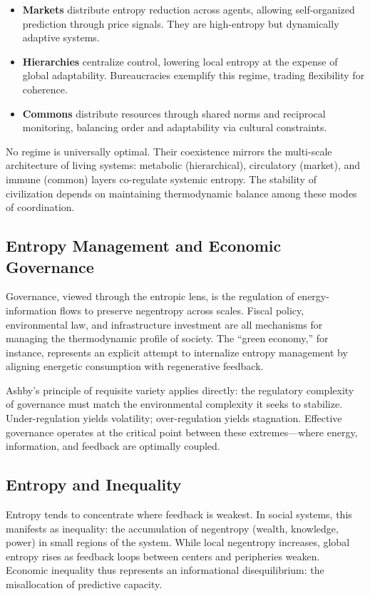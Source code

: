 \documentclass[11pt,a4paper]{article}
\begin{document}
\begin{itemize}
    \item \textbf{Markets} distribute entropy reduction across agents, allowing self-organized prediction through price signals.  They are high-entropy but dynamically adaptive systems.
    \item \textbf{Hierarchies} centralize control, lowering local entropy at the expense of global adaptability.  Bureaucracies exemplify this regime, trading flexibility for coherence.
    \item \textbf{Commons} distribute resources through shared norms and reciprocal monitoring, balancing order and adaptability via cultural constraints.
\end{itemize}

No regime is universally optimal.  Their coexistence mirrors the multi-scale architecture of living systems: metabolic (hierarchical), circulatory (market), and immune (common) layers co-regulate systemic entropy.  The stability of civilization depends on maintaining thermodynamic balance among these modes of coordination.

\subsection{Entropy Management and Economic Governance}

Governance, viewed through the entropic lens, is the regulation of energy-information flows to preserve negentropy across scales.  Fiscal policy, environmental law, and infrastructure investment are all mechanisms for managing the thermodynamic profile of society.  The “green economy,” for instance, represents an explicit attempt to internalize entropy management by aligning energetic consumption with regenerative feedback.

Ashby’s principle of requisite variety \citep{Ashby1956DesignBrain} applies directly: the regulatory complexity of governance must match the environmental complexity it seeks to stabilize.  Under-regulation yields volatility; over-regulation yields stagnation.  Effective governance operates at the critical point between these extremes—where energy, information, and feedback are optimally coupled.

\subsection{Entropy and Inequality}

Entropy tends to concentrate where feedback is weakest.  In social systems, this manifests as inequality: the accumulation of negentropy (wealth, knowledge, power) in small regions of the system.  While local negentropy increases, global entropy rises as feedback loops between centers and peripheries weaken.  Economic inequality thus represents an informational disequilibrium: the misallocation of predictive capacity.
\end{document}
